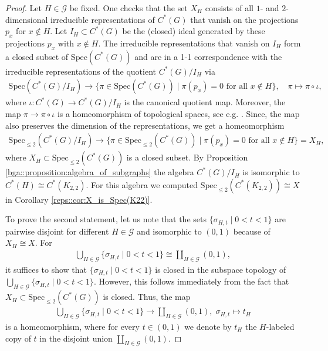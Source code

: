 \documentclass[a4paper]{amsart}
\begin{document}
\begin{proof}
    Let $H \in \mathcal{G}$ be fixed. One checks that the set $X_H$ consists of all $1$- and $2$-dimensional irreducible representations of $C^\ast(G)$ that vanish on the projections $p_x$ for $x \not \in H$. Let $I_H \subset C^\ast(G)$ be the (closed) ideal generated by these projections $p_x$ with $x \not\in H$. The irreducible representations that vanish on $I_H$ form a closed subset of $\mathrm{Spec}(C^\ast(G))$ and are in a 1-1 correspondence with the irreducible representations of the quotient $C^\ast(G) / I_H$ via
    \begin{align*}
        \mathrm{Spec}(C^\ast(G) / I_H) \to \{\pi \in \mathrm{Spec}(C^\ast(G)) \mid \pi(p_x) = 0 \text{ for all } x \not \in H\}, \quad \pi \mapsto \pi \circ \iota,
    \end{align*}
    where $\iota: C^\ast(G) \to C^\ast(G) / I_H$ is the canonical quotient map. Moreover, the map $\pi \to \pi \circ \iota$ is a homeomorphism of topological spaces, see e.g. \cite[II.6.1.3, II.6.5.13]{blackadar_operator_2006}. Since, the map also preserves the dimension of the representations, we get a homeomorphism
    \begin{align*}
        \mathrm{Spec}_{\leq 2}(C^\ast(G) / I_H) \to \{ \pi \in \mathrm{Spec}_{\leq 2}(C^\ast(G)) \mid \pi(p_x) = 0 \text{ for all } x \not \in H\} = X_H,
    \end{align*}
    where $X_H \subset \mathrm{Spec}_{\leq 2}(C^\ast(G))$ is a closed subset. 
    By Proposition \ref{bga::proposition:algebra_of_subgraphs} the algebra $C^\ast(G) / I_H$ is isomorphic to $C^\ast(H) \cong C^\ast(K_{2,2})$. For this algebra we computed $\mathrm{Spec}_{\leq 2}(C^\ast(K_{2,2})) \cong X$ in Corollary \ref{reps::cor:X_is_Spec(K22)}.

    To prove the second statement, let us note that the sets $\{\sigma_{H,t} \mid 0 < t < 1\}$ are pairwise disjoint for different $H \in \mathcal{G}$ and isomorphic to $(0,1)$ because of $X_H \cong X$. For
    \begin{align*}
        \bigcup_{H \in \mathcal{G}} \{\sigma_{H,t} \mid 0 < t < 1\} \cong \coprod_{H \in \mathcal{G}} (0,1),
    \end{align*}
    it suffices to show that $\{\sigma_{H,t} \mid 0 < t < 1\}$ is closed in the subspace topology of $\bigcup_{H \in \mathcal{G}} \{\sigma_{H,t} \mid 0 < t < 1\}$. However, this follows immediately from the fact that $X_H \subset \mathrm{Spec}_{\leq 2}(C^\ast(G))$ is closed. Thus, the map
    \begin{align*}
        \bigcup_{H \in \mathcal{G}} \{\sigma_{H,t} \mid 0 < t < 1\} \to \coprod_{H \in \mathcal{G}} (0,1), \;
        \sigma_{H, t} \mapsto t_H
    \end{align*}
    is a homeomorphism, where for every $t \in (0,1)$ we denote by $t_H$ the $H$-labeled copy of $t$ in the disjoint union $\coprod_{H \in \mathcal{G}} (0,1)$. 


\end{proof}
\end{document}
